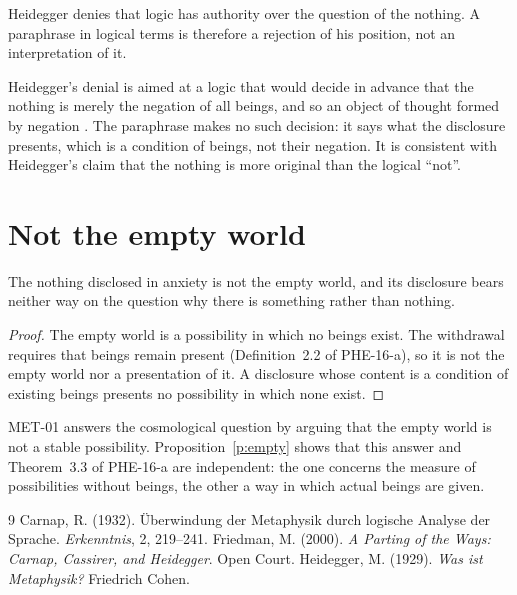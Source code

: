 \documentclass{situationist-preprint}
\begin{document}
\begin{objection}
Heidegger denies that logic has authority over the question of the nothing. A paraphrase in logical terms is therefore a rejection of his position, not an interpretation of it.
\end{objection}

\begin{reply}
Heidegger's denial is aimed at a logic that would decide in advance that the nothing is merely the negation of all beings, and so an object of thought formed by negation \citep{Heidegger1929}. The paraphrase makes no such decision: it says what the disclosure presents, which is a condition of beings, not their negation. It is consistent with Heidegger's claim that the nothing is more original than the logical \enquote{not}.
\end{reply}

\section{Not the empty world}

\begin{proposition}\label{p:empty}
The nothing disclosed in anxiety is not the empty world, and its disclosure bears neither way on the question why there is something rather than nothing.
\end{proposition}

\begin{proof}
The empty world is a possibility in which no beings exist. The withdrawal requires that beings remain present (Definition~2.2 of PHE-16-a), so it is not the empty world nor a presentation of it. A disclosure whose content is a condition of existing beings presents no possibility in which none exist.
\end{proof}

MET-01 answers the cosmological question by arguing that the empty world is not a stable possibility. Proposition~\ref{p:empty} shows that this answer and Theorem~3.3 of PHE-16-a are independent: the one concerns the measure of possibilities without beings, the other a way in which actual beings are given.

\begin{thebibliography}{9}\small
{} Carnap, R. (1932). \"Uberwindung der Metaphysik durch logische Analyse der Sprache. \emph{Erkenntnis}, 2, 219--241.
 Friedman, M. (2000). \emph{A Parting of the Ways: Carnap, Cassirer, and Heidegger}. Open Court.
 Heidegger, M. (1929). \emph{Was ist Metaphysik?} Friedrich Cohen.
\end{thebibliography}
\end{document}
